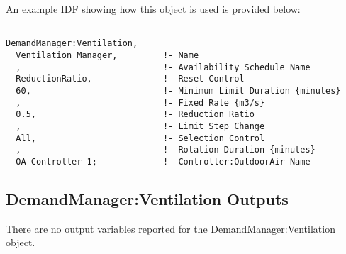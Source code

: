 An example IDF showing how this object is used is provided below:

\begin{lstlisting}

DemandManager:Ventilation,
  Ventilation Manager,         !- Name
  ,                            !- Availability Schedule Name
  ReductionRatio,              !- Reset Control
  60,                          !- Minimum Limit Duration {minutes}
  ,                            !- Fixed Rate {m3/s}
  0.5,                         !- Reduction Ratio
  ,                            !- Limit Step Change
  All,                         !- Selection Control
  ,                            !- Rotation Duration {minutes}
  OA Controller 1;             !- Controller:OutdoorAir Name
\end{lstlisting}

\subsection{DemandManager:Ventilation Outputs}\label{demandmanagerventilation-outputs}

There are no output variables reported for the DemandManager:Ventilation object.